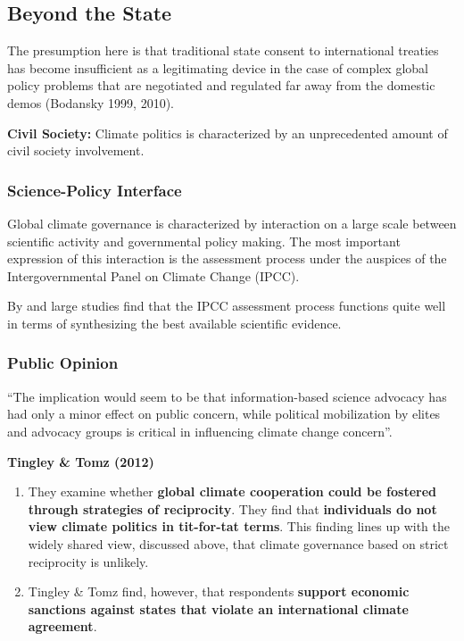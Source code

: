 \subsection{Beyond the State}

The presumption here is that traditional state consent to international treaties has become insufficient as a legitimating device in the case of complex global policy problems that are negotiated and regulated far away from the domestic demos (Bodansky 1999, 2010).

\textbf{Civil Society:} Climate politics is characterized by an unprecedented amount of civil society involvement.

\subsubsection{Science-Policy Interface}
Global climate governance is characterized by interaction on a large scale between scientific activity and governmental policy making. The most important expression of this interaction is the assessment process under the auspices of the Intergovernmental Panel on Climate Change (IPCC).

By and large studies find that the IPCC assessment process functions quite well in terms of synthesizing the best available scientific evidence.

\subsubsection{Public Opinion}
“The implication would seem to be that information-based science advocacy has had only a minor effect on public concern, while political mobilization by elites and advocacy groups is critical in influencing climate change concern”.

\textbf{Tingley \& Tomz (2012)}

\begin{enumerate}
    \item They examine whether \textbf{global climate cooperation could be fostered through strategies of reciprocity}. They find that \textbf{individuals do not view climate politics in tit-for-tat terms}. This finding lines up with the widely shared view, discussed above, that climate governance based on strict reciprocity is unlikely.

    \item Tingley \& Tomz find, however, that respondents \textbf{support economic sanctions against states that violate an international climate agreement}.
\end{enumerate}

